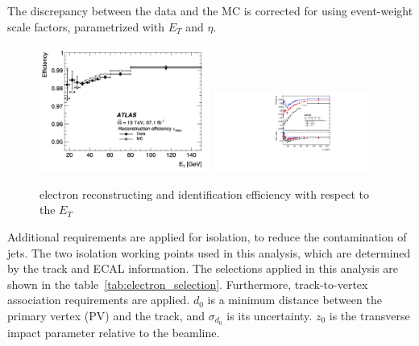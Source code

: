 The discrepancy between the data and the MC is corrected for using event-weight scale factors, parametrized with $E_T$ and $\eta$.
\begin{figure}[tbp]
\begin{center}
 \includegraphics[width=0.50\textwidth,keepaspectratio]{figures/Reconstruction/recoElectron}
 \includegraphics[width=0.45\textwidth,keepaspectratio]{figures/Reconstruction/idElectron}
\caption{
electron reconstructing and identification efficiency with respect to the $E_T$
}
\label{fig:recoElectron}
\end{center}
\end{figure}
Additional requirements are applied for isolation, to reduce the contamination of jets. 
The two isolation working points used in this analysis, which are determined by the track and ECAL information. 
The selections applied in this analysis are shown in the table~\ref{tab:electron_selection}.
Furthermore, track-to-vertex association requirements are applied. 
$d_0$ is a minimum distance between the primary vertex (PV) and the track, and $\sigma_{d_0}$ is its uncertainty. $z_0$ is the transverse impact parameter relative to the beamline.
